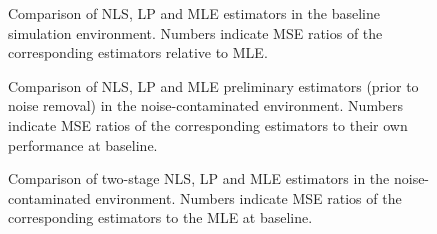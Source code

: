 \documentclass[10pt]{article}
\begin{document}
\begin{figure}
  \begin{subfigure}
    \centering
    \resizebox{1.1\linewidth}{!}{}
  \end{subfigure}
  \hfill
  \begin{subfigure}
    \centering
    \resizebox{1.1\linewidth}{!}{}
  \end{subfigure}
  \hfill
  \begin{subfigure}
    \centering
    \resizebox{1.1\linewidth}{!}{}
  \end{subfigure}
  \caption{Comparison of NLS, LP and MLE estimators in the baseline simulation environment. Numbers indicate MSE ratios of the corresponding estimators relative to MLE.}
\end{figure}

\begin{figure}
  \begin{subfigure}
    \centering
    \resizebox{1.1\linewidth}{!}{}
  \end{subfigure}
  \hfill
  \begin{subfigure}
    \centering
    \resizebox{1.1\linewidth}{!}{}
  \end{subfigure}
  \hfill
  \begin{subfigure}
    \centering
    \resizebox{1.1\linewidth}{!}{}
  \end{subfigure}
  \caption{Comparison of NLS, LP and MLE preliminary estimators (prior to noise removal) in the noise-contaminated environment. Numbers indicate MSE ratios of the corresponding estimators to their own performance at baseline.}
\end{figure}

\begin{figure}
  \begin{subfigure}
    \centering
    \resizebox{1.1\linewidth}{!}{}
  \end{subfigure}
  \hfill
  \begin{subfigure}
    \centering
    \resizebox{1.1\linewidth}{!}{}
  \end{subfigure}
  \hfill
  \begin{subfigure}
    \centering
    \resizebox{1.1\linewidth}{!}{}
  \end{subfigure}
  \caption{Comparison of two-stage NLS, LP and MLE estimators in the noise-contaminated environment. Numbers indicate MSE ratios of the corresponding estimators to the MLE at baseline.}
\end{figure}
\end{document}
